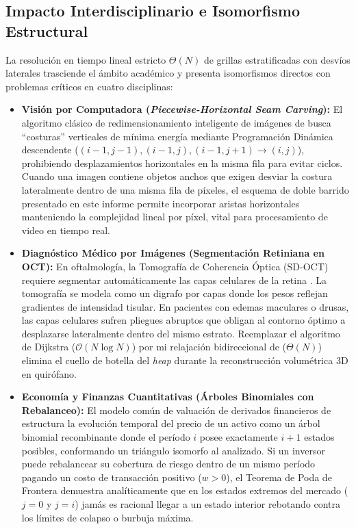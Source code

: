 \vspace{1.5ex}
\subsection{Impacto Interdisciplinario e Isomorfismo Estructural}

La resolución en tiempo lineal estricto $\Theta(N)$ de grillas estratificadas con desvíos laterales trasciende el ámbito académico y presenta isomorfismos directos con problemas críticos en cuatro disciplinas:

\begin{itemize}
    \item \textbf{Visión por Computadora (\textit{Piecewise-Horizontal Seam Carving}):} El algoritmo clásico de redimensionamiento inteligente de imágenes de \textcite{avidan2007} busca ``costuras'' verticales de mínima energía mediante Programación Dinámica descendente ($(i-1, j-1), (i-1, j), (i-1, j+1) \to (i,j)$), prohibiendo desplazamientos horizontales en la misma fila para evitar ciclos. Cuando una imagen contiene objetos anchos que exigen desviar la costura lateralmente dentro de una misma fila de píxeles, el esquema de doble barrido presentado en este informe permite incorporar aristas horizontales manteniendo la complejidad lineal por píxel, vital para procesamiento de video en tiempo real.
    
    \item \textbf{Diagnóstico Médico por Imágenes (Segmentación Retiniana en OCT):} En oftalmología, la Tomografía de Coherencia Óptica (SD-OCT) requiere segmentar automáticamente las capas celulares de la retina \parencite{chiu2010}. La tomografía se modela como un digrafo por capas donde los pesos reflejan gradientes de intensidad tisular. En pacientes con edemas maculares o drusas, las capas celulares sufren pliegues abruptos que obligan al contorno óptimo a desplazarse lateralmente dentro del mismo estrato. Reemplazar el algoritmo de Dijkstra ($\mathcal{O}(N \log N)$) por mi relajación bidireccional de ($\Theta(N)$) elimina el cuello de botella del \textit{heap} durante la reconstrucción volumétrica 3D en quirófano.
    
    \item \textbf{Economía y Finanzas Cuantitativas (Árboles Binomiales con Rebalanceo):} El modelo común de valuación de derivados financieros de \textcite{cox1979} estructura la evolución temporal del precio de un activo como un árbol binomial recombinante donde el período $i$ posee exactamente $i+1$ estados posibles, conformando un triángulo isomorfo al analizado. Si un inversor puede rebalancear su cobertura de riesgo dentro de un mismo período pagando un costo de transacción positivo ($w > 0$), el Teorema de Poda de Frontera demuestra analíticamente que en los estados extremos del mercado ($j=0$ y $j=i$) jamás es racional llegar a un estado interior rebotando contra los límites de colapso o burbuja máxima.
    

\end{itemize}
